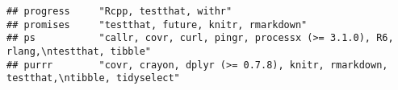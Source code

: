 \documentclass[]{book}
\begin{document}
\begin{verbatim}
## progress     "Rcpp, testthat, withr"                                                                                                                                                                                                                                                                                                                                                                                                                                                                                                                                                                                                                                                                                   
## promises     "testthat, future, knitr, rmarkdown"                                                                                                                                                                                                                                                                                                                                                                                                                                                                                                                                                                                                                                                                      
## ps           "callr, covr, curl, pingr, processx (>= 3.1.0), R6, rlang,\ntestthat, tibble"                                                                                                                                                                                                                                                                                                                                                                                                                                                                                                                                                                                                                             
## purrr        "covr, crayon, dplyr (>= 0.7.8), knitr, rmarkdown, testthat,\ntibble, tidyselect"                                                                                                                                                                                                                                                                                                                                                                                                                                                                                                                                                                                                                         

\end{verbatim}
\end{document}
